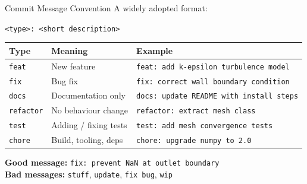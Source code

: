 \documentclass[aspectratio=169, 11pt]{beamer}
\begin{document}
\begin{frame}{Commit Message Convention}
  A widely adopted format:

  \vspace{0.5em}
  \texttt{<type>: <short description>}

  \vspace{0.5em}
  \begin{table}
    \centering
    \begin{tabular}{@{} l l l @{}}
      \toprule
      \textbf{Type} & \textbf{Meaning} & \textbf{Example} \\
      \midrule
      \texttt{feat}     & New feature           & \texttt{feat: add k-epsilon turbulence model} \\
      \texttt{fix}      & Bug fix               & \texttt{fix: correct wall boundary condition} \\
      \texttt{docs}     & Documentation only    & \texttt{docs: update README with install steps} \\
      \texttt{refactor} & No behaviour change   & \texttt{refactor: extract mesh class} \\
      \texttt{test}     & Adding / fixing tests & \texttt{test: add mesh convergence tests} \\
      \texttt{chore}    & Build, tooling, deps  & \texttt{chore: upgrade numpy to 2.0} \\
      \bottomrule
    \end{tabular}
  \end{table}

  \vspace{0.3em}
  \textbf{Good message:} \texttt{fix: prevent NaN at outlet boundary} \checkmark \\
  \textbf{Bad messages:} \texttt{stuff}, \texttt{update}, \texttt{fix bug}, \texttt{wip} \texttimes
\end{frame}
\end{document}

